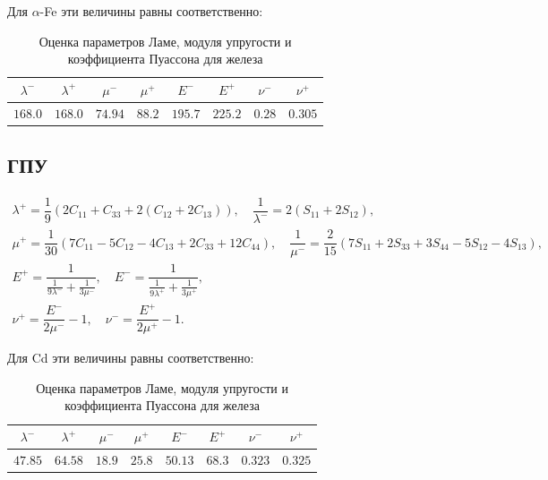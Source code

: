 \documentclass[12pt,a4paper]{article}
\begin{document}
 \pagebreak

 Для $\alpha$-Fe эти величины равны соответственно:
 \begin{table}[h!]
    \centering
    \begin{tabular}{|c|c|c|c|c|c|c|c|}
        \hline 
        $\lambda^-$ & $\lambda^+$ & $\mu^-$ & $\mu^+$ & $E^-$ & $E^+$ & $\nu^-$ & $\nu^+$ \\
        \hline 
        $168.0$ & $168.0$ & $74.94$ & $88.2$ & $195.7$ & $225.2$ & $0.28$ & $0.305$ \\
        \hline
    \end{tabular}
    \vspace{3mm}
    \caption{Оценка параметров Ламе, модуля упругости и коэффициента Пуассона для железа}
 \end{table}

 \subsection{ГПУ}
 \begin{gather*}
    \lambda^+ = \dfrac{1}{9}(2C_{11} + C_{33} + 2(C_{12} + 2C_{13})), \quad \dfrac{1}{\lambda^-} = 2(S_{11} + 2S_{12}),
    \\[0.7em]
    \mu^+ = \dfrac{1}{30}(7C_{11} - 5C_{12} - 4C_{13} + 2C_{33} + 12C_{44}), \quad \dfrac{1}{\mu^-} = \dfrac{2}{15}(7S_{11} + 2S_{33} + 3S_{44} - 5S_{12} - 4S_{13}),
    \\[0.7em]
    E^+ = \dfrac{1}{\tfrac{1}{9 \lambda^-} + \tfrac{1}{3\mu^-}}, \quad E^- = \dfrac{1}{\tfrac{1}{9 \lambda^+} + \tfrac{1}{3\mu^+}},
    \\[0.7em]
    \nu^+ = \dfrac{E^-}{2\mu^-} - 1, \quad \nu^- = \dfrac{E^+}{2\mu^+} - 1.
 \end{gather*}

 Для Cd эти величины равны соответственно: 
 \begin{table}[h!]
    \centering
    \begin{tabular}{|c|c|c|c|c|c|c|c|}
        \hline 
        $\lambda^-$ & $\lambda^+$ & $\mu^-$ & $\mu^+$ & $E^-$ & $E^+$ & $\nu^-$ & $\nu^+$ \\
        \hline 
        $47.85$ & $64.58$ & $18.9$ & $25.8$ & $50.13$ & $68.3$ & $0.323$ & $0.325$ \\
        \hline
    \end{tabular}
    \vspace{3mm}
    \caption{Оценка параметров Ламе, модуля упругости и коэффициента Пуассона для железа}
 \end{table}
\end{document}
